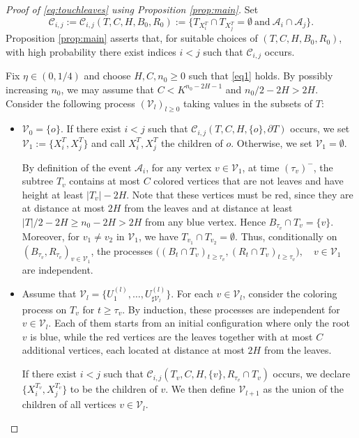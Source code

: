 \documentclass[french]{article}
\newcommand{\Tf}{T}
\renewcommand{\1}{\mathds{1}}
\begin{document}
\begin{proof}[Proof of \eqref{eq:touchleaves} using Proposition \ref{prop:main}]
Set
$$
\mathcal{C}_{i,j}
:=
\mathcal{C}_{i,j}(\Tf,C,H,B_0,R_0)
:=
\bigl\{\Tf_{X^{\Tf}_i}\cap \Tf_{X^{\Tf}_j}=\emptyset \ \text{and}\ \mathcal{A}_i\cap \mathcal{A}_j\bigr\}.
$$
Proposition \ref{prop:main} asserts that, for suitable choices of $(\Tf,C,H,B_0,R_0)$, with high probability there exist indices $i<j$ such that $\mathcal{C}_{i,j}$ occurs. 
\medskip

Fix $\eta\in(0,1/4)$ and choose $H,C,n_0\ge 0$ such that \eqref{eq1} holds. By possibly increasing $n_0$, we may assume that $C<K^{n_0-2H-1}$ and $n_0/2-2H>2H$. Consider the following process $(\mathcal{V}_l)_{l\ge 0}$ taking values in the subsets of $\Tf$:
\begin{itemize}
\item $\mathcal{V}_0=\{o\}$. If there exist $i<j$ such that $\mathcal{C}_{i,j}(\Tf,C,H,\{o\},\partial \Tf)$ occurs, we set $\mathcal{V}_1:=\{X^{\Tf}_i,X^{\Tf}_j\}$ and call $X^{\Tf}_i,X^{\Tf}_j$ the children of $o$. Otherwise, we set $\mathcal{V}_1=\emptyset$.

By definition of the event $\mathcal{A}_i$, for any vertex $v\in \mathcal{V}_1$, at time $(\tau_v)^-$, the subtree $\Tf_v$ contains at most $C$ colored vertices that are not leaves and have height at least $|\Tf_v|-2H$. Note that these vertices must be red, since they are at distance at most $2H$ from the leaves and at distance at least $|\Tf|/2-2H\ge n_0-2H>2H$ from any blue vertex. Hence $B_{\tau_v}\cap \Tf_v=\{v\}$.
Moreover, for $v_1\neq v_2$ in $\mathcal{V}_1$, we have $\Tf_{v_1}\cap \Tf_{v_2}=\emptyset$. Thus, conditionally on $(B_{\tau_v},R_{\tau_v})_{v\in \mathcal{V}_1}$, the processes
$\bigl((B_t\cap \Tf_v)_{t\ge \tau_v}, (R_t\cap \Tf_v)_{t\ge \tau_v}\bigr), \quad v\in \mathcal{V}_1$
are independent.

\item Assume that $\mathcal{V}_l=\{U_1^{(l)},\ldots,U_{\sharp\mathcal{V}_l}^{(l)}\}$. For each $v\in \mathcal{V}_l$, consider the coloring process on $\Tf_v$ for $t\ge \tau_v$. By induction, these processes are independent for $v\in \mathcal{V}_l$. Each of them starts from an initial configuration where only the root $v$ is blue, while the red vertices are the leaves together with at most $C$ additional vertices, each located at distance at most $2H$ from the leaves.

If there exist $i<j$ such that $\mathcal{C}_{i,j}(\Tf_v,C,H,\{v\},R_{\tau_v}\cap \Tf_v)$ occurs, we declare $\{X^{\Tf_v}_i,X^{\Tf_v}_j\}$ to be the children of $v$. We then define $\mathcal{V}_{l+1}$ as the union of the children of all vertices $v\in \mathcal{V}_l$.
\end{itemize}



\end{proof}
\end{document}

